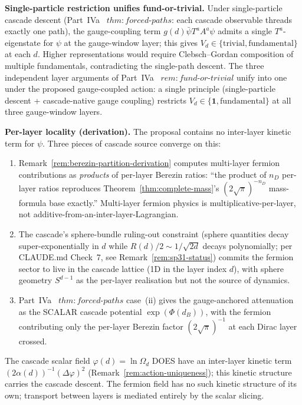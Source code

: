 \documentclass[12pt,a4paper]{article}
\begin{document}
\medskip\noindent\textbf{Single-particle restriction unifies
fund-or-trivial.} Under single-particle cascade descent
(Part~IVa~\cite{part4a} $\mathit{thm{:}forced\text{-}paths}$:
each cascade observable threads exactly one path), the
gauge-coupling term $g(d)\bar\psi T^a A^a \psi$ admits a single
$T^a$-eigenstate for $\psi$ at the gauge-window layer; this gives
$V_d \in \{\text{trivial}, \text{fundamental}\}$ at each $d$.
Higher representations would require Clebsch--Gordan composition of
multiple fundamentals, contradicting the single-path descent. The
three independent layer arguments of Part~IVa~\cite{part4a}
$\mathit{rem{:}fund\text{-}or\text{-}trivial}$ unify into one under
the proposed gauge-coupled action: a single principle
(single-particle descent + cascade-native gauge coupling) restricts
$V_d \in \{\mathbf{1}, \text{fundamental}\}$ at all three
gauge-window layers.

\medskip\noindent\textbf{Per-layer locality (derivation).}
The proposal contains no inter-layer kinetic term for $\psi$. Three
pieces of cascade source converge on this:
\begin{enumerate}[label=(\arabic*),nosep]
\item Remark~\ref{rem:berezin-partition-derivation} computes
multi-layer fermion contributions as \emph{products} of per-layer
Berezin ratios: ``the product of $n_D$ per-layer ratios reproduces
Theorem~\ref{thm:complete-mass}'s $(2\sqrt{\pi})^{-n_D}$ mass-formula base
exactly.''  Multi-layer fermion physics is multiplicative-per-layer,
not additive-from-an-inter-layer-Lagrangian.
\item The cascade's sphere-bundle ruling-out constraint (sphere
quantities decay super-exponentially in $d$ while
$R(d)/2 \sim 1/\sqrt{2d}$ decays polynomially; per CLAUDE.md
Check~7, see Remark~\ref{rem:sp31-status}) commits the fermion
sector to live in the cascade lattice (1D in the layer index $d$),
with sphere geometry
$S^{d-1}$ as the per-layer realisation but not the source of
dynamics.
\item Part~IVa~\cite{part4a} $\mathit{thm{:}forced\text{-}paths}$
case~(ii) gives the gauge-anchored attenuation as the SCALAR
cascade potential $\exp(\Phi(d_B))$, with the fermion contributing
only the per-layer Berezin factor $(2\sqrt{\pi})^{-1}$ at each
Dirac layer crossed.
\end{enumerate}
The cascade scalar field $\varphi(d) = \ln\Omega_d$ DOES have an
inter-layer kinetic term $(2\alpha(d))^{-1}(\Delta\varphi)^2$
(Remark~\ref{rem:action-uniqueness}); this kinetic structure
carries the cascade descent. The fermion field has no such kinetic
structure of its own; transport between layers is mediated entirely
by the scalar slicing.
\end{document}
